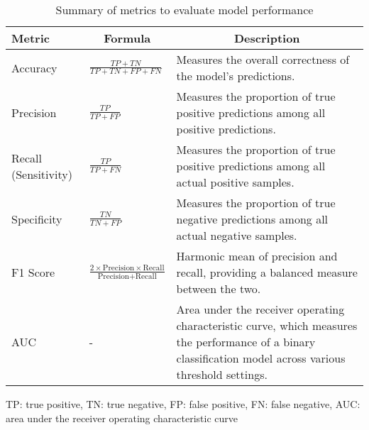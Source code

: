 \begin{table}[ht]
  \begin{threeparttable}
    \captionsetup{justification=raggedright,singlelinecheck=false}
    \caption{Summary of metrics to evaluate model performance}
    \label{tab:metrics-summary}
    \renewcommand{\arraystretch}{1.25}
    \begin{tabular}{@{}p{3.5cm}p{4cm}p{6.5cm}@{}}
        \toprule
        \textbf{Metric} & \multicolumn{1}{c}{\textbf{Formula}} & \multicolumn{1}{c}{\textbf{Description}}\\ 
        \midrule
            Accuracy & \centering$\displaystyle\frac{TP + TN}{TP + TN + FP + FN}$ & Measures the overall correctness of the model's predictions.\\
            Precision & \centering$\displaystyle\frac{TP}{TP + FP}$ & Measures the proportion of true positive predictions among all positive predictions.\\
            Recall (Sensitivity) & \centering$\displaystyle\frac{TP}{TP + FN}$ & Measures the proportion of true positive predictions among all actual positive samples.\\
            Specificity & \centering$\displaystyle\frac{TN}{TN + FP}$  & Measures the proportion of true negative predictions among all actual negative samples.\\
            F1 Score & \centering$\displaystyle\frac{2 \times \text{Precision} \times \text{Recall}}{\text{Precision} + \text{Recall}}$  &  Harmonic mean of precision and recall, providing a balanced measure between the two.\\
            AUC & \centering- & Area under the receiver operating characteristic curve, which measures the performance of a binary classification model across various threshold settings. \\
        \bottomrule
    \end{tabular}
    \begin{tablenotes}
    \small
    \item TP: true positive, TN: true negative, FP: false positive, FN: false negative, AUC: area under the receiver operating characteristic curve
    \end{tablenotes}
\end{threeparttable}
\end{table}

